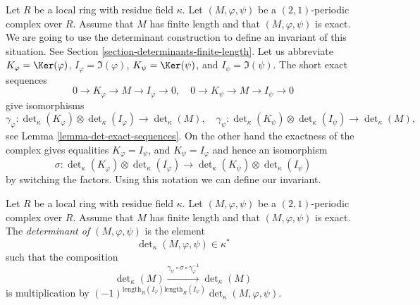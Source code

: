 \noindent
Let $R$ be a local ring with residue field $\kappa$.
Let $(M, \varphi, \psi)$ be a $(2, 1)$-periodic complex over $R$.
Assume that $M$ has finite length and that $(M, \varphi, \psi)$ is
exact. We are going to use the determinant construction to define
an invariant of this situation. See
Section \ref{section-determinants-finite-length}.
Let us abbreviate
$K_\varphi = \Ker(\varphi)$,
$I_\varphi = \Im(\varphi)$,
$K_\psi = \Ker(\psi)$, and
$I_\psi = \Im(\psi)$.
The short exact sequences
$$
0 \to K_\varphi \to M \to I_\varphi \to 0, \quad
0 \to K_\psi \to M \to I_\psi \to 0
$$
give isomorphisms
$$
\gamma_\varphi :
\det\nolimits_\kappa(K_\varphi)
\otimes
\det\nolimits_\kappa(I_\varphi)
\longrightarrow
\det\nolimits_\kappa(M), \quad
\gamma_\psi :
\det\nolimits_\kappa(K_\psi)
\otimes
\det\nolimits_\kappa(I_\psi)
\longrightarrow
\det\nolimits_\kappa(M),
$$
see Lemma \ref{lemma-det-exact-sequences}.
On the other hand the exactness of the complex gives equalities
$K_\varphi = I_\psi$, and $K_\psi = I_\varphi$
and hence an isomorphism
$$
\sigma :
\det\nolimits_\kappa(K_\varphi)
\otimes
\det\nolimits_\kappa(I_\varphi)
\longrightarrow
\det\nolimits_\kappa(K_\psi)
\otimes
\det\nolimits_\kappa(I_\psi)
$$
by switching the factors. Using this notation we can define our invariant.

\begin{definition}
\label{definition-periodic-determinant}
Let $R$ be a local ring with residue field $\kappa$.
Let $(M, \varphi, \psi)$ be a $(2, 1)$-periodic complex over $R$.
Assume that $M$ has finite length and that $(M, \varphi, \psi)$ is
exact. The {\it determinant of $(M, \varphi, \psi)$} is
the element
$$
\det\nolimits_\kappa(M, \varphi, \psi) \in \kappa^*
$$
such that the composition
$$
\det\nolimits_\kappa(M)
\xrightarrow{\gamma_\psi \circ \sigma \circ \gamma_\varphi^{-1}}
\det\nolimits_\kappa(M)
$$
is multiplication by
$(-1)^{\text{length}_R(I_\varphi)\text{length}_R(I_\psi)}
\det\nolimits_\kappa(M, \varphi, \psi)$.
\end{definition}

